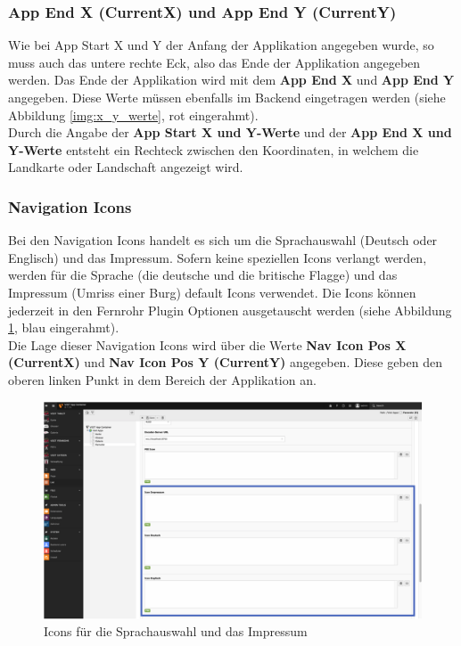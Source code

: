 \subsubsection{App End X (CurrentX) und App End Y (CurrentY)}

Wie bei App Start X und Y der Anfang der Applikation angegeben wurde, so muss auch das untere rechte Eck, also das Ende der Applikation angegeben werden. Das Ende der Applikation wird mit dem \textbf{App End X} und \textbf{App End Y} angegeben. Diese Werte müssen ebenfalls im Backend eingetragen werden (siehe Abbildung \ref{img:x_y_werte}, rot eingerahmt).\\

Durch die Angabe der \textbf{App Start X und Y-Werte} und der \textbf{App End X und Y-Werte} entsteht ein Rechteck zwischen den Koordinaten, in welchem die Landkarte oder Landschaft angezeigt wird.




\subsubsection{Navigation Icons}

Bei den Navigation Icons handelt es sich um die Sprachauswahl (Deutsch oder Englisch) und das Impressum. Sofern keine speziellen Icons verlangt werden, werden für die Sprache (die deutsche und die britische Flagge) und das Impressum (Umriss einer Burg) default Icons verwendet. Die Icons können jederzeit in den Fernrohr Plugin Optionen ausgetauscht werden (siehe Abbildung \ref{img:default_icons}, blau eingerahmt).\\

Die Lage dieser Navigation Icons wird über die Werte \textbf{Nav Icon Pos X (CurrentX)} und \textbf{Nav Icon Pos Y (CurrentY)} angegeben. Diese geben den oberen linken Punkt in dem Bereich der Applikation an.

\begin{figure}[ht!]
\centering
\includegraphics[width=12cm]{Figures/paula/fernrohr/einrichtung_fernrohr/default_icons.png}
\caption{Icons für die Sprachauswahl und das Impressum}
\label{img:default_icons}
\end{figure}


